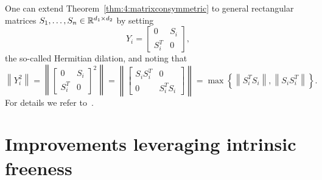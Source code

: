 \begin{remark}
One can extend Theorem~\ref{thm:4:matrixconsymmetric} to general rectangular matrices $S_1,\dots,S_n\in\mathbb{R}^{d_1\times d_2}$ by setting
\[
Y_i = \left[ \begin{array}{cc}  0 & S_i \\ S_i^T & 0   \end{array} \right],
\]
the so-called Hermitian dilation, and noting that
\[
\left\| Y_i^2 \right\| = \left\| \left[ \begin{array}{cc}  0 & S_i \\ S_i^T & 0   \end{array} \right]^2   \right\| 
= \left\| \left[ \begin{array}{cc}  S_iS_i^T & 0 \\ 0 & S_i^TS_i    \end{array} \right]   \right\| = \max\left\{ \left\| S_i^TS_i \right\|, \left\| S_iS_i^T \right\|  \right\}.
\]
For details we refer to~\cite{Tropp_MatrixConcentrationElementary}.
\end{remark}



\section{Improvements leveraging intrinsic freeness}\label{subsec:freeprobimprovement}

